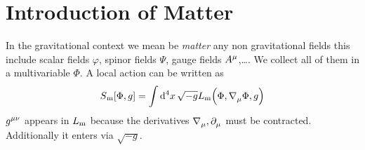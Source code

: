 \section{Introduction of Matter}
In the gravitational context we mean be \emph{matter} any non gravitational
fields this include scalar fields $\varphi$, spinor fields $\Psi$, gauge fields
$\tensor{A}{^\mu}$,\dots. We collect all of them in a multivariable $\Phi$.
A local action can be written as
\begin{equation}
S\textsubscript{m}[\Phi,g]=\fourint  \sqrt{-g}
L\textsubscript{m}\left(\Phi,\tensor{\nabla}{_\mu}\Phi,g\right)
\end{equation}
$\tensor{g}{^\mu^\nu}$ appears in $L\textsubscript{m}$ because the derivatives
$\tensor{\nabla}{_\mu}, \tensor{\partial}{_\mu}$ must be contracted.
Additionally it enters via $\sqrt{-g}$.
